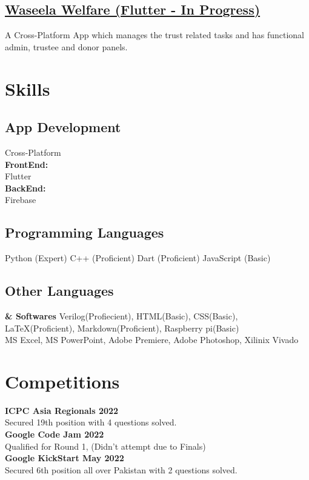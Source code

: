 \documentclass[]{plushcv}
\begin{document}
\begin{minipage}[t]{0.25\textwidth}
    \subsection{\href{https://github.com/smabbasht/Waseela-Welfare}{\textbf{Waseela Welfare (Flutter -  In Progress)}}}
    A Cross-Platform App which manages the trust related tasks and has functional admin, trustee and donor panels.



\section{Skills}
\subsection{App Development}
Cross-Platform\\
\textbf{FrontEnd:}\\ Flutter \\
\textbf{BackEnd:}\\ Firebase \\

\subsection{Programming Languages}
Python (Expert)
C++ (Proficient)
Dart (Proficient)
JavaScript (Basic)

\subsection{Other Languages}
\textbf{\& Softwares}
Verilog(Profiecient), 
HTML(Basic),
CSS(Basic),
LaTeX(Proficient),
Markdown(Proficient), 
Raspberry pi(Basic) \\

MS Excel, 
MS PowerPoint, 
Adobe Premiere, 
Adobe Photoshop, 
Xilinix Vivado


\section{Competitions} 
\textbf{ICPC Asia Regionals 2022}\\
Secured 19th position with 4 questions solved. \\ 
\textbf{Google Code Jam 2022}\\
Qualified for Round 1, (Didn't attempt due to Finals) \\ 
\textbf{Google KickStart May 2022}\\
Secured 6th position all over Pakistan with 2 questions solved.\\ 

\end{minipage} 
\end{document}
